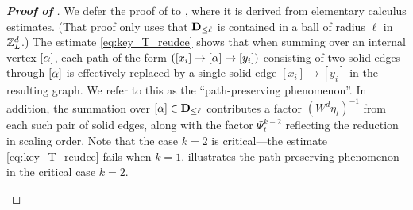 \begin{proof}[\bf Proof of ]
 
We defer the proof of  to , where it is derived from elementary calculus estimates. (That proof only uses that ${\mathbf{D}}_{\le\ell}$ is contained in a ball of radius $\ell$ in ${\mathbb Z}_L^d$.)
The estimate \eqref{eq:key_T_reudce} shows that when summing over an internal vertex $[\alpha]$, each path of the form $([x_i]\to [\alpha]\to [y_i])$ consisting of two solid edges through $[\alpha]$ is effectively replaced by a single solid edge $[x_i]\to [y_i]$ in the resulting graph. We refer to this as the ``path-preserving phenomenon''. In addition, the summation over $[\alpha]\in {\mathbf{D}}_{\le \ell}$ contributes a factor $(W^d\eta_t)^{-1}$ from each such pair of solid edges, along with the factor $\Psi_t^{k-2}$ reflecting the reduction in scaling order. Note that the case $k=2$ is critical---the estimate \eqref{eq:key_T_reudce} fails when $k=1$.  illustrates the path-preserving phenomenon in the critical case $k=2$.

  \begin{figure}[h]
    \centering
\end{figure}
\end{proof}
